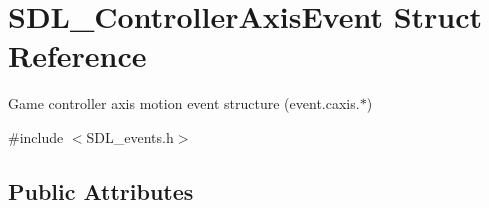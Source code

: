 \hypertarget{struct_s_d_l___controller_axis_event}{}\section{S\+D\+L\+\_\+\+Controller\+Axis\+Event Struct Reference}
\label{struct_s_d_l___controller_axis_event}


Game controller axis motion event structure (event.\+caxis.$\ast$)  




{\ttfamily \#include $<$S\+D\+L\+\_\+events.\+h$>$}

\subsection*{Public Attributes}
